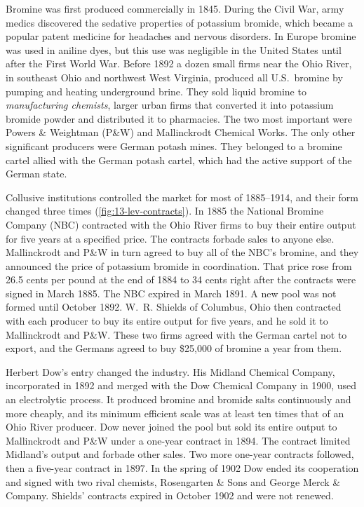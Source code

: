 Bromine was first produced commercially in 1845. During the Civil War, army medics discovered the sedative
properties of potassium bromide, which became a popular patent medicine for headaches and nervous disorders. In
Europe bromine was used in aniline dyes, but this use was negligible in the United States until after the First
World War. Before 1892 a dozen small firms near the Ohio River, in southeast Ohio and northwest West Virginia,
produced all U.S.\ bromine by pumping and heating underground brine. They sold liquid bromine to
\emph{manufacturing chemists}, larger urban firms that converted it into potassium bromide powder and distributed
it to pharmacies. The two most important were Powers \& Weightman (P\&W) and Mallinckrodt Chemical Works. The only
other significant producers were German potash mines. They belonged to a bromine cartel allied with the German
potash cartel, which had the active support of the German state.

Collusive institutions controlled the market for most of 1885--1914, and their form changed three times
(\cref{fig:13-lev-contracts}). In 1885 the National Bromine Company (NBC) contracted with the Ohio River firms to
buy their entire output for five years at a specified price. The contracts forbade sales to anyone else.
Mallinckrodt and P\&W in turn agreed to buy all of the NBC's bromine, and they announced the price of potassium
bromide in coordination. That price rose from 26.5 cents per pound at the end of 1884 to 34 cents right after the
contracts were signed in March 1885. The NBC expired in March 1891. A new pool was not formed until October 1892.
W.~R. Shields of Columbus, Ohio then contracted with each producer to buy its entire output for five years, and he
sold it to Mallinckrodt and P\&W. These two firms agreed with the German cartel not to export, and the Germans
agreed to buy \$25,000 of bromine a year from them.

Herbert Dow's entry changed the industry. His Midland Chemical Company, incorporated in 1892 and merged with the
Dow Chemical Company in 1900, used an electrolytic process. It produced bromine and bromide salts continuously
and more cheaply, and its minimum efficient scale was at least ten times that of an Ohio River producer. Dow never
joined the pool but sold its entire output to Mallinckrodt and P\&W under a one-year contract in 1894. The
contract limited Midland's output and forbade other sales. Two more one-year contracts followed, then a five-year
contract in 1897. In the spring of 1902 Dow ended its cooperation and signed with two rival chemists, Rosengarten
\& Sons and George Merck \& Company. Shields' contracts expired in October 1902 and were not renewed.

